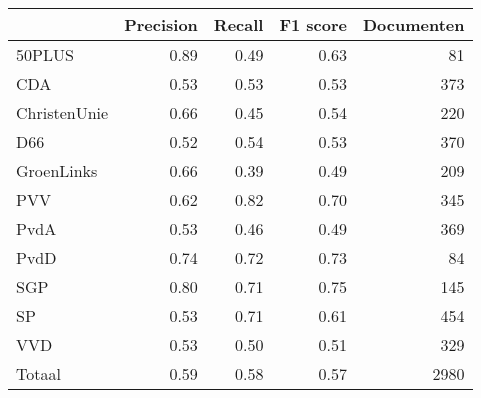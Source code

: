 \begin{tabular}{lrrrr}
\toprule
{} &  Precision &  Recall &  F1 score &  Documenten \\
\midrule
50PLUS       &       0.89 &    0.49 &      0.63 &          81 \\
CDA          &       0.53 &    0.53 &      0.53 &         373 \\
ChristenUnie &       0.66 &    0.45 &      0.54 &         220 \\
D66          &       0.52 &    0.54 &      0.53 &         370 \\
GroenLinks   &       0.66 &    0.39 &      0.49 &         209 \\
PVV          &       0.62 &    0.82 &      0.70 &         345 \\
PvdA         &       0.53 &    0.46 &      0.49 &         369 \\
PvdD         &       0.74 &    0.72 &      0.73 &          84 \\
SGP          &       0.80 &    0.71 &      0.75 &         145 \\
SP           &       0.53 &    0.71 &      0.61 &         454 \\
VVD          &       0.53 &    0.50 &      0.51 &         329 \\
Totaal       &       0.59 &    0.58 &      0.57 &        2980 \\
\bottomrule
\end{tabular}
